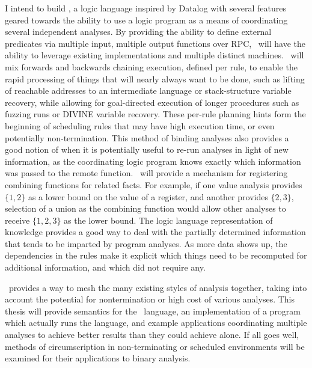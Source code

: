 I intend to build \sysname, a logic language inspired by Datalog with several features geared towards the ability to use a logic program as a means of coordinating several independent analyses.
By providing the ability to define external predicates via multiple input, multiple output functions over RPC, \sysname\ will have the ability to leverage existing implementations and multiple distinct machines.
\sysname\ will mix forwards and backwards chaining execution, defined per rule, to enable the rapid processing of things that will nearly always want to be done, such as lifting of reachable addresses to an intermediate language or stack-structure variable recovery, while allowing for goal-directed execution of longer procedures such as fuzzing runs or DIVINE variable recovery.
These per-rule planning hints form the beginning of scheduling rules that may have high execution time, or even potentially non-termination.
This method of binding analyses also provides a good notion of when it is potentially useful to re-run analyses in light of new information, as the coordinating logic program knows exactly which information was passed to the remote function.
\sysname\ will provide a mechanism for registering combining functions for related facts.
For example, if one value analysis provides $\{1, 2\}$ as a lower bound on the value of a register, and another provides $\{2, 3\}$, selection of a union as the combining function would allow other analyses to receive $\{1, 2, 3\}$ as the lower bound.
The logic language representation of knowledge provides a good way to deal with the partially determined information that tends to be imparted by program analyses. As more data shows up, the dependencies in the rules make it explicit which things need to be recomputed for additional information, and which did not require any.

\sysname\ provides a way to mesh the many existing styles of analysis together, taking into account the potential for nontermination or high cost of various analyses. This thesis will provide semantics for the \sysname\ language, an implementation of a program which actually runs the language, and example applications coordinating multiple analyses to achieve better results than they could achieve alone. If all goes well, methods of circumscription in non-terminating or scheduled environments will be examined for their applications to binary analysis.
